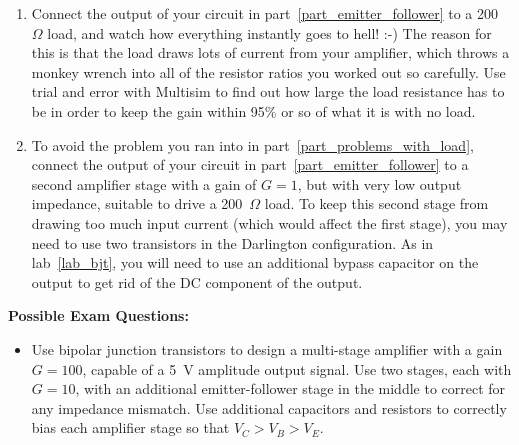 \begin{enumerate}[wide]
\item Connect the output of your circuit in part~\ref{part_emitter_follower} to a 200~$\Omega$ load, and watch how everything instantly goes to hell!  :-)  The reason for this is that the load draws lots of current from your amplifier, which throws a monkey wrench into all of the resistor ratios you worked out so carefully.  Use trial and error with Multisim to find out how large the load resistance has to be in order to keep the gain within 95\% or so of what it is with no load. \label{part_problems_with_load}

\item To avoid the problem you ran into in part~\ref{part_problems_with_load}, connect the output of your circuit in part~\ref{part_emitter_follower} to a second amplifier stage with a gain of $G=1$, but with very low output impedance, suitable to drive a 200~$\Omega$ load.  To keep this second stage from drawing too much input current (which would affect the first stage), you may need to use two transistors in the Darlington configuration.  As in lab~\ref{lab_bjt}, you will need to use an additional bypass capacitor on the output to get rid of the DC component of the output. \label{part_common_emitter_and_emitter_follower}


\end{enumerate}

\pagebreak[3]
\textbf{Possible Exam Questions:}

\begin{itemize}

\item Use bipolar junction transistors to design a multi-stage amplifier with a gain $G=100$, capable of a 5~V amplitude output signal.  Use two stages, each with $G=10$, with an additional emitter-follower stage in the middle to correct for any impedance mismatch.  Use additional capacitors and resistors to correctly bias each amplifier stage so that $V_C > V_B > V_E$.

\end{itemize}




